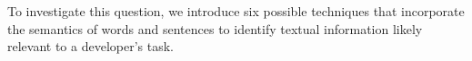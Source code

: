 To investigate this question, we introduce six possible techniques that incorporate the  
semantics of words and sentences to identify textual information likely relevant to a developer's task.












